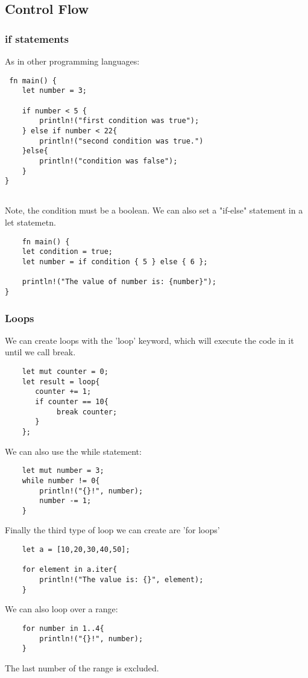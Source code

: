 \subsection{Control Flow}
\subsubsection{if statements}
As in other programming languages:\begin{verbatim}
 fn main() {
    let number = 3;

    if number < 5 {
        println!("first condition was true");
    } else if number < 22{
        println!("second condition was true.")
    }else{
        println!("condition was false");
    }
}
   
\end{verbatim}
Note, the condition must be a boolean. We can also set a "if-else" statement in a let statemetn.\begin{verbatim}
    fn main() {
    let condition = true;
    let number = if condition { 5 } else { 6 };

    println!("The value of number is: {number}");
}
\end{verbatim}
\subsubsection{Loops}
We can create loops with the 'loop' keyword, which will execute the code in it until we call break.\begin{verbatim}
    let mut counter = 0;
    let result = loop{
       counter += 1;
       if counter == 10{
            break counter;
       }
    };
\end{verbatim}

We can also use the while statement:\begin{verbatim}
    let mut number = 3;
    while number != 0{
        println!("{}!", number);
        number -= 1;
    }
\end{verbatim}

Finally the third type of loop we can create are 'for loops'\begin{verbatim}
    let a = [10,20,30,40,50];
    
    for element in a.iter{
        println!("The value is: {}", element);
    }
\end{verbatim}

We can also loop over a range:\begin{verbatim}
    for number in 1..4{
        println!("{}!", number);
    }
\end{verbatim}
The last number of the range is excluded.
